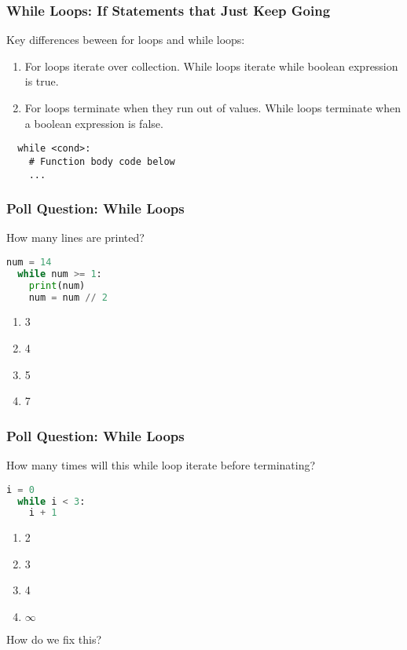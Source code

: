 \documentclass{beamer}
\begin{document}
%
%
%
\begin{frame}[fragile]
  \frametitle{While Loops: If Statements that Just Keep Going}
    Key differences beween for loops and while loops:
    \begin{enumerate}
      \item For loops iterate over collection. While loops iterate while boolean expression is true.
      \item For loops terminate when they run out of values. While loops terminate when a boolean expression is false.
    \end{enumerate}
    \vfill
  \begin{lstlisting}
  while <cond>:
    # Function body code below
    ...
  \end{lstlisting}
\end{frame}

%
%
\begin{frame}[fragile]
  \frametitle{Poll Question: While Loops}
  How many lines are printed?
  \begin{lstlisting}[language=Python, autogobble]
  num = 14
  while num >= 1:
    print(num)
    num = num // 2
  \end{lstlisting}
  \vfill
  \begin{enumerate}[A]
    \item 3
    \item 4
    \item 5
    \item 7
  \end{enumerate}
\end{frame}

%
%
\begin{frame}[fragile]
  \frametitle{Poll Question: While Loops}
  How many times will this while loop iterate before terminating?
  \begin{lstlisting}[language=Python, autogobble]
  i = 0 
  while i < 3:
    i + 1
  \end{lstlisting}
  \vfill
  \begin{enumerate}[A]
    \item 2
    \item 3
    \item 4
    \item $\infty$
  \end{enumerate}
  \pause
  How do we fix this?
\end{frame}
\end{document}
